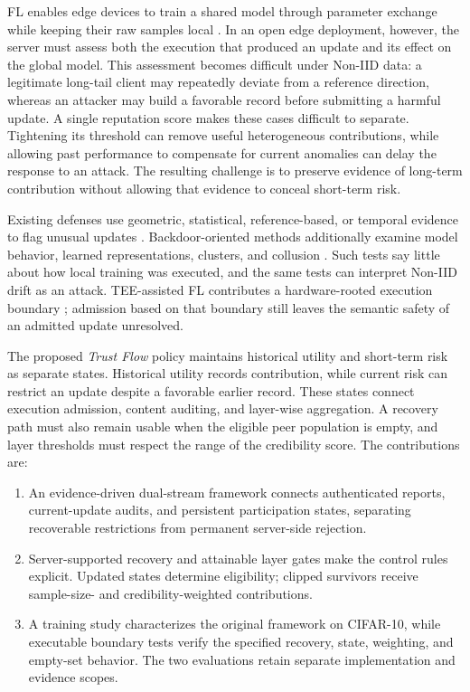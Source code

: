 \documentclass[conference,compsoc]{IEEEtran}
\newenvironment{tightenumerate}{%
    \begin{enumerate}\setlength{\itemsep}{1pt}\setlength{\parskip}{0pt}\setlength{\parsep}{0pt}}{\end{enumerate}}
\begin{document}
FL enables edge devices to train a shared model through parameter exchange while keeping their raw samples local \cite{kairouz2021flsurvey,mcmahan2017fedavg}. In an open edge deployment, however, the server must assess both the execution that produced an update and its effect on the global model. This assessment becomes difficult under Non-IID data: a legitimate long-tail client may repeatedly deviate from a reference direction, whereas an attacker may build a favorable record before submitting a harmful update. A single reputation score makes these cases difficult to separate. Tightening its threshold can remove useful heterogeneous contributions, while allowing past performance to compensate for current anomalies can delay the response to an attack. The resulting challenge is to preserve evidence of long-term contribution without allowing that evidence to conceal short-term risk.

Existing defenses use geometric, statistical, reference-based, or temporal evidence to flag unusual updates \cite{blanchard2017krum,yin2018byzantine,cao2021fltrust,fung2020foolsgold,fldetector2022}. Backdoor-oriented methods additionally examine model behavior, learned representations, clusters, and collusion \cite{deepsight2022,flame2022,crowdguard2024,roseagg}. Such tests say little about how local training was executed, and the same tests can interpret Non-IID drift as an attack. TEE-assisted FL contributes a hardware-rooted execution boundary \cite{r1_tee_integrity,xu2021distributed,r5_tee_mitigating,lu2025tmt}; admission based on that boundary still leaves the semantic safety of an admitted update unresolved.

The proposed \emph{Trust Flow} policy maintains historical utility and
short-term risk as separate states. Historical utility records contribution,
while current risk can restrict an update despite a favorable earlier record.
These states connect execution admission, content auditing, and layer-wise
aggregation. A recovery path must also remain usable when the eligible peer
population is empty, and layer thresholds must respect the range of the
credibility score. The contributions are:
\begin{tightenumerate}
    \item An evidence-driven dual-stream framework connects authenticated reports,
    current-update audits, and persistent participation states, separating
    recoverable restrictions from permanent server-side rejection.
    \item Server-supported recovery and attainable layer gates make the control
    rules explicit. Updated states determine eligibility; clipped survivors
    receive sample-size- and credibility-weighted contributions.
    \item A training study characterizes the original framework on CIFAR-10,
    while executable boundary tests verify the specified recovery, state,
    weighting, and empty-set behavior. The two evaluations retain separate
    implementation and evidence scopes.
\end{tightenumerate}
\end{document}
